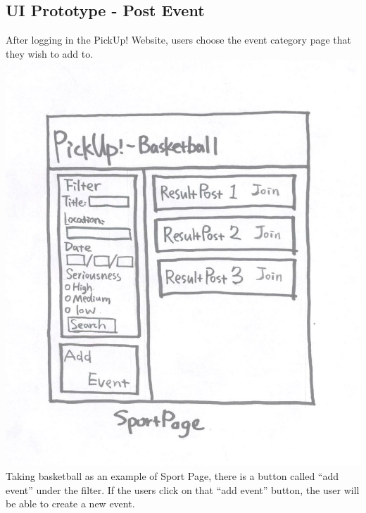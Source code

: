 \documentclass[a4paper]{article}
\begin{document}
\subsection{UI Prototype - Post Event}
After logging in the PickUp! Website, users choose the event category page that they wish to add to.
\includegraphics[width=\textwidth]{images/sport_page.pdf}
Taking basketball as an example of Sport Page, there is a button called “add event” under the filter. If the users click on that “add event” button, the user will be able to create a new event.
\end{document}
